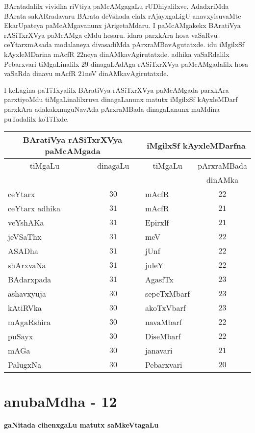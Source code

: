 BAratadalilx vividha riVtiya paMcAMgagaLu rUDhiyalilxve. AdadxriMda BArata sakARradavaru BArata deVshada elalx rAjayxgaLigU anavxyisuvaMte EkarUpateya paMcAMgavanunx jArigetaMdaru. I paMcAMgakekx BAratiVya rASiTxrXVya paMcAMga eMdu hesaru. idara parxkAra hosa vaSaRvu ceYtarxmAsada modalaneya divasadiMda pArxraMBavAgutatxde. idu iMgilxSf kAyxleMDarina mAcfR $22$neya dinAMkavAgirutatxde. adhika vaSaRdalilx Pebarxvari tiMgaLinalilx $29$ dinagaLAdAga rASiTxrXVya paMcAMgadalilx hosa vaSaRda dinavu mAcfR $21$neV dinAMkavAgirutatxde.

I keLagina paTiTxyalilx BAratiVya rASiTxrXVya paMcAMgada parxkAra parxtiyoMdu tiMgaLinalilxruva dinagaLanunx matutx iMgilxSf kAyxleMDarf parxkAra adakakxnuguNavAda pArxraMBada dinagaLanunx muMdina puTadalilx koTiTxde.

{\renewcommand{\arraystretch}{1.1}
\begin{longtable}{|l|c|l|c|}
\hline
\multicolumn{2}{|c|}{BAratiVya rASiTxrXVya paMcAMgada} & \multicolumn{2}{c|}{iMgilxSf kAyxleMDarfna}\\
\hline
\multicolumn{1}{|c|}{tiMgaLu} & dinagaLu & \multicolumn{1}{c|}{tiMgaLu} & pArxraMBada\\
 & & & dinAMka\\
\hline
ceYtarx & $30$ & mAcfR & $22$\\
ceYtarx adhika & $31$ & mAcfR & $21$\\
veYshAKa & $31$ & Epirxlf & $21$\\
jeVSaThx & $31$ & meV & $22$\\
ASADha & $31$ & jUnf & $22$\\
shArxvaNa & $31$ & juleY & $22$\\
BAdarxpada & $31$ & AgasfTx & $23$\\
ashavxyuja & $30$ & sepeTxMbarf & $23$\\
kAtiRVka & $30$ & akoTxVbarf & $23$\\
mAgaRshira & $30$ & navaMbarf & $22$\\
puSayx & $30$ & DiseMbarf & $22$\\
mAGa & $30$ & janavari & $21$\\
PalugxNa & $30$ & Pebarxvari & $20$\\
\hline
\end{longtable}}


\chapter{anubaMdha - 12}

\begin{center}
{\large\bf gaNitada cihenxgaLu matutx saMkeVtagaLu}
\medskip

{\large\bf {}}
\end{center}

